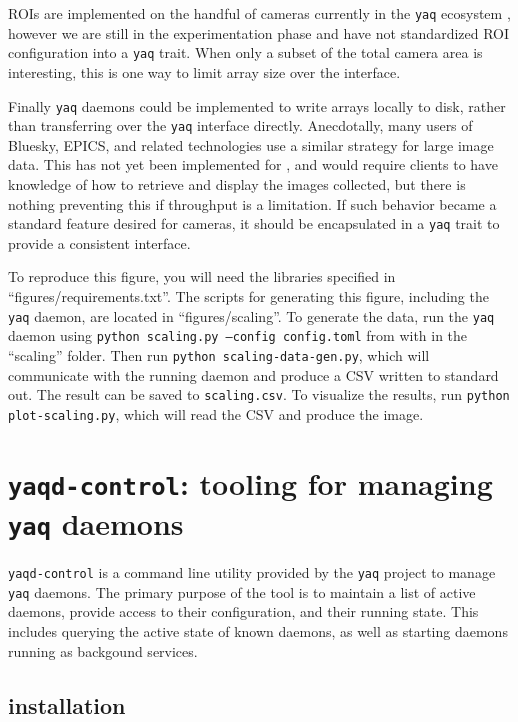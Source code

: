 \documentclass[11pt, full]{article}
\newcommand\yaq{\texttt{yaq}}
\let\stdsection\section
\renewcommand\section{\clearpage\stdsection}
\begin{document}
ROIs are implemented on the handful of cameras currently in the \yaq{} ecosystem \cite{yaqd_andor,yaqd_pi}, however we are still in the experimentation phase and have not standardized ROI configuration into a \yaq{} trait.
When only a subset of the total camera area is interesting, this is one way to limit array size over the interface.

Finally \yaq{} daemons could be implemented to write arrays locally to disk, rather than transferring over the \yaq{} interface directly.
Anecdotally, many users of Bluesky, EPICS, and related technologies use a similar strategy for large image data.
This has not yet been implemented for \ya{}, and would require clients to have knowledge of how to retrieve and display the images collected, but there is nothing preventing this if throughput is a limitation.
If such behavior became a standard feature desired for cameras, it should be encapsulated in a \yaq{} trait to provide a consistent interface.

To reproduce this figure, you will need the libraries specified in ``figures/requirements.txt''.
The scripts for generating this figure, including the \yaq{} daemon, are located in ``figures/scaling''.
To generate the data, run the \yaq{} daemon using \texttt{python scaling.py --config config.toml} from with in the ``scaling'' folder.
Then run \texttt{python scaling-data-gen.py}, which will communicate with the running daemon and produce a CSV written to standard out.
The result can be saved to \texttt{scaling.csv}.
To visualize the results, run \texttt{python plot-scaling.py}, which will read the CSV and produce the image.

\clearpage

\section{\texttt{yaqd-control}: tooling for managing \yaq{} daemons}

\texttt{yaqd-control} is a command line utility provided by the \yaq{} project to manage \yaq{} daemons.
The primary purpose of the tool is to maintain a list of active daemons, provide access to their configuration, and their running state.
This includes querying the active state of known daemons, as well as starting daemons running as backgound services.

\subsection{installation}
\end{document}
